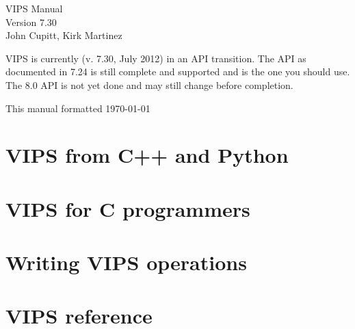\documentclass[a4paper,twocolumn,dvips]{book}
\begin{document}

\begin{titlepage}
\thispagestyle{empty}
\begin{center}
\huge
VIPS Manual\\
\large Version 7.30\\
\vspace{0.5in}
\large
John Cupitt,
Kirk Martinez\\
\end{center}

VIPS is currently (v. 7.30, July 2012) in an API transition. The API as
documented in 7.24 is still complete and supported and is the one you should
use. The 8.0 API is not yet done and may still change before completion.

\vspace{5in}

This manual formatted \today
\setcounter{page}{1}
\end{titlepage}

\tableofcontents
\thispagestyle{plain}

\listoffigures
\thispagestyle{plain}

\listoftables
\thispagestyle{plain}

{}
\thispagestyle{plain}
\cfoot{}

\chapter{VIPS from C++ and Python}








\chapter{VIPS for C programmers}








\chapter{Writing VIPS operations}






\chapter{VIPS reference}



\end{document}
